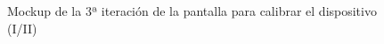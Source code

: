 \begin{itemize}
   
\begin{figure}[H]
    \centering
    \begin{minipage}{.6\textwidth}
        \centering
        \caption[Mockup de la 3ª iteración de la pantalla para calibrar el dispositivo (I/II)]{Mockup de la 3ª iteración de la pantalla para calibrar el dispositivo (I/II)}
        \label{c4:fig:v3:android:05CalibrateDevice}
    \end{minipage}
\end{figure}   


\end{itemize}
